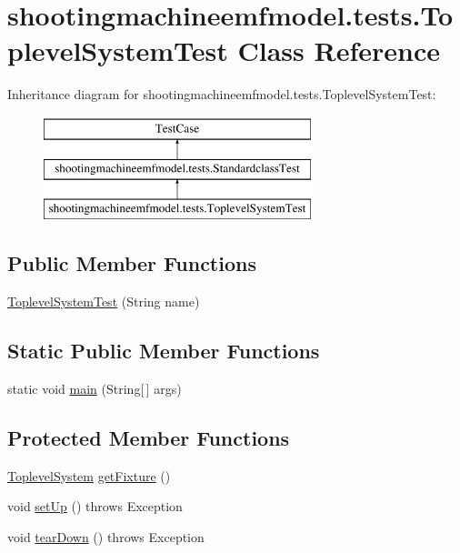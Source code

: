 \hypertarget{classshootingmachineemfmodel_1_1tests_1_1_toplevel_system_test}{\section{shootingmachineemfmodel.\-tests.\-Toplevel\-System\-Test Class Reference}
\label{classshootingmachineemfmodel_1_1tests_1_1_toplevel_system_test}
}
Inheritance diagram for shootingmachineemfmodel.\-tests.\-Toplevel\-System\-Test\-:\begin{figure}[H]
\begin{center}
\leavevmode
\includegraphics[height=3.000000cm]{classshootingmachineemfmodel_1_1tests_1_1_toplevel_system_test}
\end{center}
\end{figure}
\subsection*{Public Member Functions}
\begin{DoxyCompactItemize}
\item 
\hyperlink{classshootingmachineemfmodel_1_1tests_1_1_toplevel_system_test_a24a2eaab8fa7ad39458f654f9b7acd39}{Toplevel\-System\-Test} (String name)
\end{DoxyCompactItemize}
\subsection*{Static Public Member Functions}
\begin{DoxyCompactItemize}
\item 
static void \hyperlink{classshootingmachineemfmodel_1_1tests_1_1_toplevel_system_test_ab8f55a99af15b639fe3d3695fc26b12c}{main} (String\mbox{[}$\,$\mbox{]} args)
\end{DoxyCompactItemize}
\subsection*{Protected Member Functions}
\begin{DoxyCompactItemize}
\item 
\hyperlink{interfaceshootingmachineemfmodel_1_1_toplevel_system}{Toplevel\-System} \hyperlink{classshootingmachineemfmodel_1_1tests_1_1_toplevel_system_test_a55421790b18ca01472e9e236d2b66b77}{get\-Fixture} ()
\item 
void \hyperlink{classshootingmachineemfmodel_1_1tests_1_1_toplevel_system_test_ae877e7c5f73cd1e519bb280d0b4b1715}{set\-Up} ()  throws Exception 
\item 
void \hyperlink{classshootingmachineemfmodel_1_1tests_1_1_toplevel_system_test_ac18c006a964fd003c85ab89ed67375b3}{tear\-Down} ()  throws Exception 
\end{DoxyCompactItemize}

